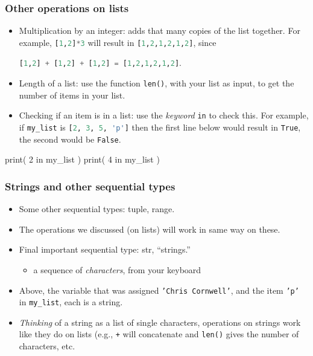 \documentclass{beamer}
\newenvironment{codeblock}
    {\hfill\begin{beamerboxesrounded}[lower=codecol, width=0.8\textwidth]
    \medskip

    }
    { 
    \end{beamerboxesrounded}\hfill
    }
\theoremstyle{example}
\newcommand{\ct}[1]{\lstinline[language=Python]!#1!}
\newcommand{\ttt}[1]{{\small\texttt{#1}}}
\begin{document}
\begin{frame}[fragile]
\frametitle{Other operations on lists}

\begin{itemize}
	\item Multiplication by an integer: adds that many copies of the list together. For example, \ct{[1,2]*3} will result in \ct{[1,2,1,2,1,2]}, since 
	\begin{center}\ct{[1,2] + [1,2] + [1,2] = [1,2,1,2,1,2]}.
	\end{center}
	\pause
	\item Length of a list: use the function \ttt{len()}, with your list as input, to get the number of items in your list.
	\pause
	\item Checking if an item is in a list: use the \emph{keyword} \ttt{in} to check this. For example, if \ttt{my}\ct{_}\ttt{list} is \ct{[2, 3, 5, 'p']} then the first line below would result in \ttt{True}, the second would be \ttt{False}.
\end{itemize}

\begin{codeblock}

\begin{python}
print( 2 in my_list )
print( 4 in my_list )
\end{python}

\end{codeblock}

\end{frame}

\begin{frame}
\frametitle{Strings and other sequential types}

\begin{itemize}
	\item Some other sequential types: {\ttb tuple}, {\ttb range}.
	\item The operations we discussed (on lists) will work in same way on these.

	\pause
	\item Final important sequential type: {\ttb str}, ``strings.''
	\begin{itemize}
		\item a sequence of \emph{characters}, from your keyboard
	\end{itemize}
	\item Above, the variable that was assigned \ttt{'Chris Cornwell'}, and the item \ttt{'p'} in \ttt{my}\ct{_}\ttt{list}, each is a string.
	\pause
	\item \emph{Thinking} of a string as a list of single characters, operations on strings work like they do on lists (e.g., \ttt{+} will concatenate and \ttt{len()} gives the number of characters, etc. 
\end{itemize}
\end{frame}
\end{document}

